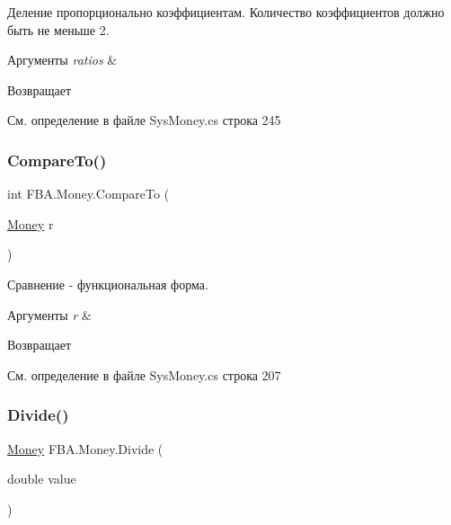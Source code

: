 Деление пропорционально коэффициентам. Количество коэффициентов должно быть не меньше 2. 


\begin{DoxyParams}{Аргументы}
{\em ratios} & \\
\hline
\end{DoxyParams}
\begin{DoxyReturn}{Возвращает}

\end{DoxyReturn}


См. определение в файле Sys\+Money.\+cs строка 245

\mbox{\label{struct_f_b_a_1_1_money_aa098429e1734d7103df5f46245ec255d}} 
\subsubsection{\texorpdfstring{Compare\+To()}{CompareTo()}}
{\footnotesize\ttfamily int F\+B\+A.\+Money.\+Compare\+To (\begin{DoxyParamCaption}\item[{\mbox{\hyperlink{struct_f_b_a_1_1_money}{Money}}}]{r }\end{DoxyParamCaption})}



Сравнение -\/ функциональная форма. 


\begin{DoxyParams}{Аргументы}
{\em r} & \\
\hline
\end{DoxyParams}
\begin{DoxyReturn}{Возвращает}

\end{DoxyReturn}


См. определение в файле Sys\+Money.\+cs строка 207

\mbox{\label{struct_f_b_a_1_1_money_a121b21f5f3554e8460861e611fbac8cd}} 
\subsubsection{\texorpdfstring{Divide()}{Divide()}}
{\footnotesize\ttfamily \mbox{\hyperlink{struct_f_b_a_1_1_money}{Money}} F\+B\+A.\+Money.\+Divide (\begin{DoxyParamCaption}\item[{double}]{value }\end{DoxyParamCaption})}



